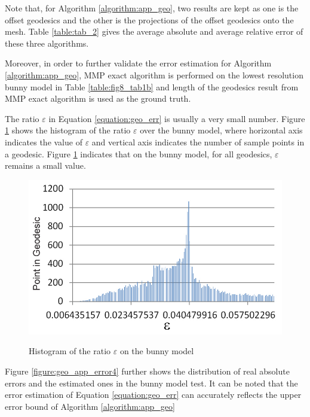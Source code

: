 Note that, for Algorithm \ref{algorithm:app_geo}, two results are kept as one is the offset geodesics and the other is the projections of the offset geodesics onto the mesh. Table \ref{table:tab_2} gives the average absolute and average relative error of these three algorithms. 

Moreover, in order to further validate the error estimation for Algorithm \ref{algorithm:app_geo}, MMP exact algorithm is performed on the lowest resolution bunny model in Table \ref{table:fig8_tab1b} and length of the geodesics result from MMP exact algorithm is used as the ground truth. 

The ratio $\varepsilon$ in Equation \ref{equation:geo_err} is usually a very small number. Figure \ref{figure:geo_app_error3} shows the histogram of the ratio $\varepsilon$ over the bunny model, where horizontal axis indicates the value of $\varepsilon$ and vertical axis indicates the number of sample points in a geodesic. Figure \ref{figure:geo_app_error3} indicates that on the bunny model, for all geodesics, $\varepsilon$ remains a small value. 

\begin{figure}[H]
	\centering
	\includegraphics[width=0.9\columnwidth]{../images/geodesic_image/figure7a}\\
    \caption{Histogram of the ratio $\varepsilon$ on the bunny model}
    \label{figure:geo_app_error3}
\end{figure}

Figure \ref{figure:geo_app_error4} further shows the distribution of real absolute errors and the estimated ones in the bunny model test. It can be noted that the error estimation of Equation \ref{equation:geo_err} can accurately reflects the upper error bound of Algorithm \ref{algorithm:app_geo}



